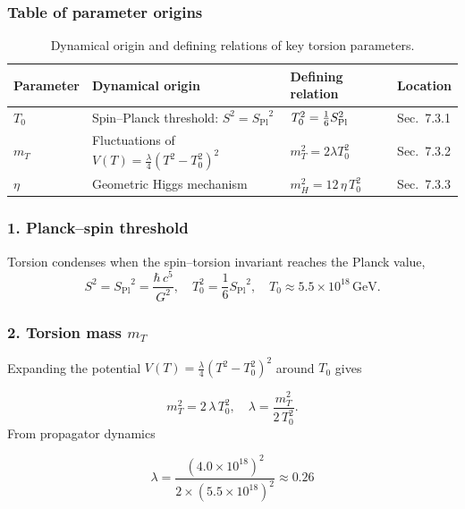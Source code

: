 \documentclass{article}
\newcommand{\Splanck}{\ensuremath{S_{\mathrm{Pl}}}}
\begin{document}
\subsubsection*{Table of parameter origins}
\begin{table}[h]
\centering
\begin{tabular}{|l|l|l|l|}
\hline
\textbf{Parameter} & \textbf{Dynamical origin} & \textbf{Defining relation} & \textbf{Location} \\
\hline
$T_{0}$ & Spin–Planck threshold: $S^2 = \Splanck^2$ & $T_0^2=\tfrac16S_{\rm Pl}^2$ & Sec.~7.3.1 \\
\hline
$m_{T}$ & Fluctuations of $V(T)=\tfrac\lambda4(T^2-T_0^2)^2$ & $m_T^2=2\lambda T_0^2$ & Sec.~7.3.2 \\
\hline
$\eta$ & Geometric Higgs mechanism & $m_H^2=12\,\eta\,T_0^2$ & Sec.~7.3.3 \\
\hline
\end{tabular}
\caption{Dynamical origin and defining relations of key torsion parameters.}
\end{table}

\medskip

\subsubsection*{1. Planck–spin threshold}
Torsion condenses when the spin–torsion invariant reaches the Planck value,
\begin{equation}
  S^2 = \Splanck^2 = \frac{\hbar\,c^5}{G^2},
  \quad
  T_0^2 = \frac{1}{6}\Splanck^2,
  \quad
  T_0\approx5.5\times10^{18}\,\mathrm{GeV}.
\end{equation}

\subsubsection*{2. Torsion mass $m_T$}
Expanding the potential $V(T)=\tfrac\lambda4(T^2-T_0^2)^2$ around $T_0$ gives

\begin{equation}\label{eq:auto36}
m_T^2 = 2\,\lambda\,T_0^2,
  \quad
  \lambda = \frac{m_T^2}{2\,T_0^2}.
\end{equation}
From propagator dynamics

\begin{equation}
\lambda = \frac{(4.0 \times 10^{18})^2}{2 \times (5.5 \times 10^{18})^2} \approx 0.26
\tag{41,5}
\end{equation}
\end{document}

